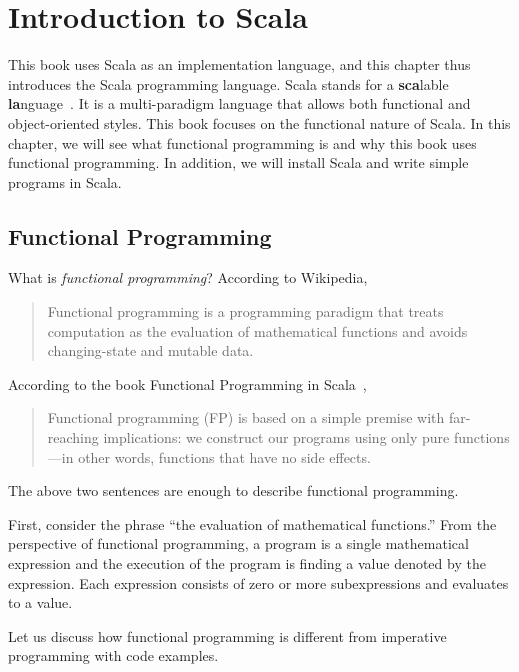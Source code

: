 \setchapterpreamble[u]{\margintoc}
\chapter{Introduction to Scala}

This book uses Scala as an implementation language, and
this chapter thus introduces the Scala programming language. Scala stands for a
\textbf{sca}lable \textbf{la}nguage~\cite{programming-in-scala}. It is a
multi-paradigm language that allows both functional and object-oriented styles.
This book focuses on the functional nature of Scala. In this chapter, we will
see what functional programming is and why this book uses functional
programming. In addition, we will install Scala and write simple programs in
Scala.

\section{Functional Programming}

What is \textit{functional programming}?
According to Wikipedia,

\begin{quote}
Functional programming is a programming paradigm that treats computation as the
evaluation of mathematical functions and avoids changing-state and mutable data.
\end{quote}

According to the book Functional Programming in Scala~\cite{fp-in-scala},

\begin{quote}
Functional programming (FP) is based on a simple premise with far-reaching
implications: we construct our programs using only pure functions---in other words,
functions that have no side effects.
\end{quote}

The above two sentences are enough to describe functional programming.

First, consider the phrase ``the evaluation of mathematical functions.''
From the perspective of functional programming, a
program is a single mathematical expression and the execution of the program is
finding a value denoted by the expression.
Each expression consists of zero or more subexpressions and evaluates to a value.

Let us discuss how
functional programming is different from imperative programming with
code examples.


